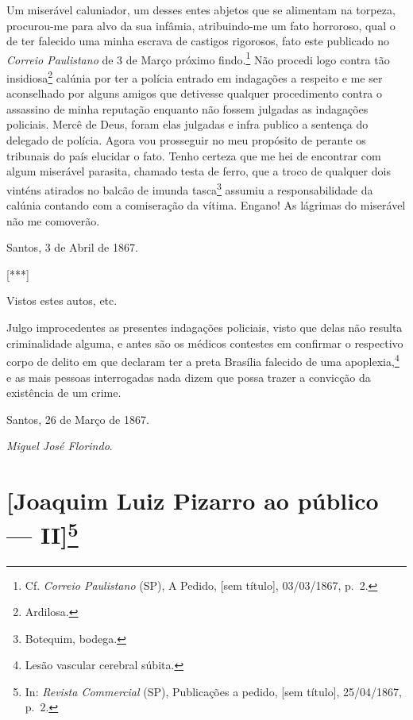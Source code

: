 \asterisc{}

Um miserável caluniador, um desses entes abjetos que se alimentam na
torpeza, procurou-me para alvo da sua infâmia, atribuindo-me um fato
horroroso, qual o de ter falecido uma minha escrava de castigos
rigorosos, fato este publicado no \emph{Correio Paulistano} de 3 de
Março próximo findo.\footnote{ Cf. \emph{Correio Paulistano} (SP), A
  Pedido, {[}sem título{]}, 03/03/1867, p.~2.} Não procedi logo contra
tão insidiosa\textsuperscript{⁠}\footnote{ Ardilosa.} calúnia por ter
a polícia entrado em indagações a respeito e me ser aconselhado por
alguns amigos que detivesse qualquer procedimento contra o assassino de
minha reputação enquanto não fossem julgadas as indagações policiais.
Mercê de Deus, foram elas julgadas e infra publico a sentença do
delegado de polícia. Agora vou prosseguir no meu propósito de perante os
tribunais do país elucidar o fato. Tenho certeza que me hei de encontrar
com algum miserável parasita, chamado testa de ferro, que a troco de
qualquer dois vinténs atirados no balcão de imunda
tasca\textsuperscript{⁠}\footnote{ Botequim, bodega.} assumiu a
responsabilidade da calúnia contando com a comiseração da vítima.
Engano! As lágrimas do miserável não me comoverão.

Santos, 3 de Abril de 1867.

{[}***{]}

Vistos estes autos, etc.

Julgo improcedentes as presentes indagações policiais, visto que delas
não resulta criminalidade alguma, e antes são os médicos contestes em
confirmar o respectivo corpo de delito em que declaram ter a preta
Brasília falecido de uma apoplexia,\footnote{ Lesão vascular cerebral
  súbita.} e as mais pessoas interrogadas nada dizem que possa trazer a
convicção da existência de um crime.

Santos, 26 de Março de 1867.

\emph{Miguel José Florindo}.

\chapter{{[}Joaquim Luiz Pizarro ao público ---
II{]}\footnote{In: \emph{Revista Commercial} (SP), Publicações a
  pedido, {[}sem título{]}, 25/04/1867, p.~2.}}

